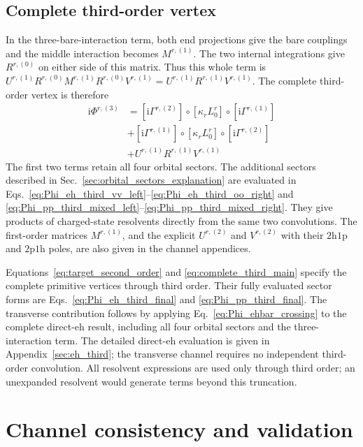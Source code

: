 \documentclass[aip,jcp,reprint,noshowkeys,superscriptaddress]{revtex4-1}
\newcommand{\ii}{\mathrm{i}}
\newcommand{\hhp}{\text{2h1p}}
\newcommand{\pph}{\text{2p1h}}
\newcommand{\eh}{\text{eh}}
\begin{document}
\subsection{Complete third-order vertex}

In the three-bare-interaction term, both end projections give the bare
couplings and the middle interaction becomes $M^{r,(1)}$.
The two internal integrations give $R^{r,(0)}$ on either side of this
matrix. Thus this whole term is
$U^{r,(1)}R^{r,(0)}M^{r,(1)}R^{r,(0)}V^{r,(1)}
=U^{r,(1)}R^{r,(1)}V^{r,(1)}$.
The complete third-order vertex is therefore
\begin{equation}
\begin{split}
    \ii\Phi^{r,(3)}
    &=[\ii\Gamma^{r,(2)}]\circ[\kappa_r L_0^r]
    \circ[\ii\Gamma^{r,(1)}]
    \\
    &+[\ii\Gamma^{r,(1)}]\circ[\kappa_r L_0^r]
    \circ[\ii\Gamma^{r,(2)}]
    \\
    &+U^{r,(1)}R^{r,(1)}V^{r,(1)}
\end{split}
\label{eq:complete_third_main}
\end{equation}
The first two terms retain all four orbital sectors.
The additional sectors described in
Sec.~\ref{sec:orbital_sectors_explanation} are evaluated in
Eqs.~\eqref{eq:Phi_eh_third_vv_left}--\eqref{eq:Phi_eh_third_oo_right}
and \eqref{eq:Phi_pp_third_mixed_left}--\eqref{eq:Phi_pp_third_mixed_right}.
They give products of charged-state resolvents directly from the same
two convolutions.
The first-order matrices $M^{r,(1)}$, and the explicit $U^{r,(2)}$
and $V^{r,(2)}$ with their $\hhp$ and $\pph$ poles, are also given in
the channel appendices.

Equations~\eqref{eq:target_second_order} and
\eqref{eq:complete_third_main} specify the complete primitive vertices
through third order. Their fully evaluated sector forms are
Eqs.~\eqref{eq:Phi_eh_third_final} and \eqref{eq:Phi_pp_third_final}.
The transverse contribution follows by applying
Eq.~\eqref{eq:Phi_ehbar_crossing} to the complete direct-$\eh$ result,
including all four orbital sectors and the three-interaction term.
The detailed direct-$\eh$ evaluation is given in
Appendix~\ref{sec:eh_third}; the transverse channel requires no independent
third-order convolution.
All resolvent expressions are used only through third order; an
unexpanded resolvent would generate terms beyond this truncation.

\section{Channel consistency and validation}
\label{sec:channel_consistency}
\end{document}
